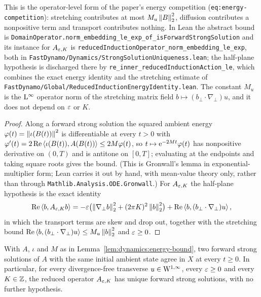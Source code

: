 This is the operator-level form of the paper's energy competition
(\texttt{eq:energy-competition}): stretching contributes at most
$M_u\left\|B\right\|_2^2 $,
diffusion contributes a nonpositive term and transport contributes nothing.  In Lean the
abstract bound is
\texttt{DomainOperator.norm\_embedding\_le\_exp\_of\_isForwardStrongSolution} and its
instance for $A_{\varepsilon,K} $ is
\texttt{reducedInductionOperator\_norm\_embedding\_le\_exp}, both in
\texttt{FastDynamo/Dynamics/StrongSolutionUniqueness.lean}; the half-plane hypothesis is
discharged there by \texttt{re\_inner\_reducedInductionAction\_le}, which combines the
exact energy identity and the stretching estimate of
\texttt{FastDynamo/Global/ReducedInductionEnergyIdentity.lean}.  The constant $M_u $ is the
$\mathrm{L}^\infty $ operator norm of the stretching matrix field
$b\mapsto(b_\perp\cdot\nabla_\perp)u $, and it does not depend on $\varepsilon $ or $K $.

\begin{proof}
  \leanok
  Along a forward strong solution the squared ambient energy
  $\varphi(t)=\left\|\iota(B(t))\right\|^2 $ is differentiable at every $t>0 $ with
  $\varphi'(t)=2\operatorname{Re}\left\langle\iota(B(t)),A(B(t))\right\rangle\leq2M\varphi(t) $, so
  $t\mapsto\mathrm{e}^{-2Mt}\varphi(t) $ has nonpositive derivative on $(0,T) $ and is antitone on
  $[0,T] $; evaluating at the endpoints and taking square roots gives the bound.  (This is
  Gronwall's lemma in exponential-multiplier form; Lean carries it out by hand, with
  mean-value theory only, rather than through \texttt{Mathlib.Analysis.ODE.Gronwall}.)
  For $A_{\varepsilon,K} $ the
  half-plane hypothesis is the exact identity
  \[
    \operatorname{Re}\left\langle b,A_{\varepsilon,K}b\right\rangle
    =-\varepsilon\bigl(\left\|\nabla_\perp b\right\|_2^2+(2\pi K)^2\left\|b\right\|_2^2\bigr)
    +\operatorname{Re}\left\langle b,(b_\perp\cdot\nabla_\perp)u\right\rangle,
  \]
  in which the transport terms are skew and drop out, together with the stretching bound
  $\operatorname{Re}\left\langle b,(b_\perp\cdot\nabla_\perp)u\right\rangle\leq M_u\left\|b\right\|_2^2 $ and $\varepsilon\geq0 $.
\end{proof}

\begin{lemma}
  \label{lem:dynamics:strong-solution-uniqueness}
  \leanok
  With $A $, $\iota $ and $M $ as in Lemma~\ref{lem:dynamics:energy-bound}, two forward
  strong solutions of $A $ with the same initial ambient state agree in $X $ at every
  $t\geq0 $.  In particular, for every divergence-free transverse $u\in\mathrm{W}^{1,\infty} $,
  every $\varepsilon\geq0 $ and every $K\in\mathbb{Z} $, the reduced operator $A_{\varepsilon,K} $ has unique
  forward strong solutions, with no further hypothesis.
\end{lemma}

